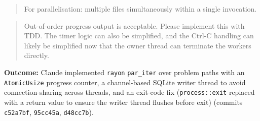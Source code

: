 \begin{quote}
  For parallelisation: multiple files simultaneously within a single invocation.
\end{quote}

\begin{quote}
  Out-of-order progress output is acceptable. Please implement this with TDD.
  The timer logic can also be simplified, and the Ctrl-C handling can likely be
  simplified now that the owner thread can terminate the workers directly.
\end{quote}

\textbf{Outcome:} Claude implemented \texttt{rayon} \texttt{par\_iter} over
problem paths with an \texttt{AtomicUsize} progress counter, a channel-based
SQLite writer thread to avoid connection-sharing across threads, and an
exit-code fix (\texttt{process::exit} replaced with a return value to ensure
the writer thread flushes before exit)
(commits \texttt{c52a7bf}, \texttt{95cc45a}, \texttt{d48cc7b}).
